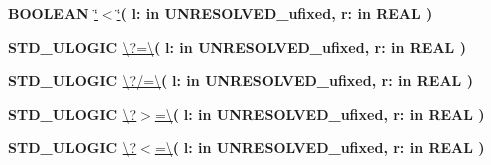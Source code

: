 \begin{DoxyCompactItemize}
\item 
{\bfseries {\bfseries \textcolor{comment}{B\+O\+O\+L\+E\+A\+N}\textcolor{vhdlchar}{ }}} \hyperlink{class__fixed__pkg_a5d059cf3277e3585e4f3f076db10b273}{\char`\"{}$<$\char`\"{}}{\bfseries  ( }{\bfseries \textcolor{vhdlchar}{l\+: }\textcolor{stringliteral}{in }\textcolor{vhdlchar}{U\+N\+R\+E\+S\+O\+L\+V\+E\+D\+\_\+ufixed}}{\bfseries  , \textcolor{vhdlchar}{r\+: }\textcolor{stringliteral}{in }{\bfseries \textcolor{comment}{R\+E\+A\+L}\textcolor{vhdlchar}{ }}}{\bfseries  )} 
\item 
{\bfseries {\bfseries \textcolor{comment}{S\+T\+D\+\_\+\+U\+L\+O\+G\+I\+C}\textcolor{vhdlchar}{ }}} \hyperlink{class__fixed__pkg_a69151531d87456d952c2073704fa1779}{\textbackslash{}?=\textbackslash{}}{\bfseries  ( }{\bfseries \textcolor{vhdlchar}{l\+: }\textcolor{stringliteral}{in }\textcolor{vhdlchar}{U\+N\+R\+E\+S\+O\+L\+V\+E\+D\+\_\+ufixed}}{\bfseries  , \textcolor{vhdlchar}{r\+: }\textcolor{stringliteral}{in }{\bfseries \textcolor{comment}{R\+E\+A\+L}\textcolor{vhdlchar}{ }}}{\bfseries  )} 
\item 
{\bfseries {\bfseries \textcolor{comment}{S\+T\+D\+\_\+\+U\+L\+O\+G\+I\+C}\textcolor{vhdlchar}{ }}} \hyperlink{class__fixed__pkg_a172a73302b09f0d298b93ecda8c5e976}{\textbackslash{}?/=\textbackslash{}}{\bfseries  ( }{\bfseries \textcolor{vhdlchar}{l\+: }\textcolor{stringliteral}{in }\textcolor{vhdlchar}{U\+N\+R\+E\+S\+O\+L\+V\+E\+D\+\_\+ufixed}}{\bfseries  , \textcolor{vhdlchar}{r\+: }\textcolor{stringliteral}{in }{\bfseries \textcolor{comment}{R\+E\+A\+L}\textcolor{vhdlchar}{ }}}{\bfseries  )} 
\item 
{\bfseries {\bfseries \textcolor{comment}{S\+T\+D\+\_\+\+U\+L\+O\+G\+I\+C}\textcolor{vhdlchar}{ }}} \hyperlink{class__fixed__pkg_a3adee8c12e5c0bb76fc3e1a493284a27}{\textbackslash{}?$>$=\textbackslash{}}{\bfseries  ( }{\bfseries \textcolor{vhdlchar}{l\+: }\textcolor{stringliteral}{in }\textcolor{vhdlchar}{U\+N\+R\+E\+S\+O\+L\+V\+E\+D\+\_\+ufixed}}{\bfseries  , \textcolor{vhdlchar}{r\+: }\textcolor{stringliteral}{in }{\bfseries \textcolor{comment}{R\+E\+A\+L}\textcolor{vhdlchar}{ }}}{\bfseries  )} 
\item 
{\bfseries {\bfseries \textcolor{comment}{S\+T\+D\+\_\+\+U\+L\+O\+G\+I\+C}\textcolor{vhdlchar}{ }}} \hyperlink{class__fixed__pkg_a271da29f659a2bc9480dbd29d7727913}{\textbackslash{}?$<$=\textbackslash{}}{\bfseries  ( }{\bfseries \textcolor{vhdlchar}{l\+: }\textcolor{stringliteral}{in }\textcolor{vhdlchar}{U\+N\+R\+E\+S\+O\+L\+V\+E\+D\+\_\+ufixed}}{\bfseries  , \textcolor{vhdlchar}{r\+: }\textcolor{stringliteral}{in }{\bfseries \textcolor{comment}{R\+E\+A\+L}\textcolor{vhdlchar}{ }}}{\bfseries  )} 

\end{DoxyCompactItemize}
